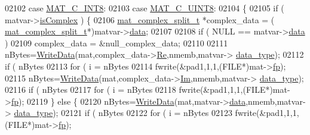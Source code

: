 \begin{DoxyCode}
{{{{{{{{{{{{{{{{02102         \textcolor{keywordflow}{case} \hyperlink{group___m_a_t_ggad4d60ae7b709fc81bfd744fb4c857c40a984ff310f9e906100fcff95f704f43c5}{MAT\_C\_INT8}:
02103         \textcolor{keywordflow}{case} \hyperlink{group___m_a_t_ggad4d60ae7b709fc81bfd744fb4c857c40a81270f8093cb4808e992c1d29d84d4e3}{MAT\_C\_UINT8}:
02104         \{
02105             \textcolor{keywordflow}{if} ( matvar->\hyperlink{group___m_a_t_aeb03b3a69f108dc05470b00443a43739}{isComplex} ) \{
02106                 \hyperlink{group___m_a_t_structmat__complex__split__t}{mat\_complex\_split\_t} *complex\_data = (
      \hyperlink{group___m_a_t_structmat__complex__split__t}{mat\_complex\_split\_t}*)matvar->\hyperlink{group___m_a_t_a5672978efa230bbdecdf38ede781f7fa}{data};
02107 
02108                 if ( NULL == matvar->\hyperlink{group___m_a_t_a5672978efa230bbdecdf38ede781f7fa}{data} )
02109                     complex\_data = &null\_complex\_data;
02110 
02111                 nBytes=\hyperlink{mat5_8c_a1bec2ccf2a3b48706edd32e63744d364}{WriteData}(mat,complex\_data->\hyperlink{group___m_a_t_a484a93607508adac2bce53a0252e0325}{Re},nmemb,matvar->
      \hyperlink{group___m_a_t_ab6aafe9bd77f0f077852593dec438144}{data\_type});
02112                 \textcolor{keywordflow}{if} ( nBytes %
02113                     \textcolor{keywordflow}{for} ( i = nBytes %
02114                         fwrite(&pad1,1,1,(FILE*)mat->\hyperlink{struct__mat__t_a85f562e407ca9ad4d2a6e14f839432b7}{fp});
02115                 nBytes=\hyperlink{mat5_8c_a1bec2ccf2a3b48706edd32e63744d364}{WriteData}(mat,complex\_data->\hyperlink{group___m_a_t_a7182d10b0d3598415887376065440946}{Im},nmemb,matvar->
      \hyperlink{group___m_a_t_ab6aafe9bd77f0f077852593dec438144}{data\_type});
02116                 \textcolor{keywordflow}{if} ( nBytes %
02117                     \textcolor{keywordflow}{for} ( i = nBytes %
02118                         fwrite(&pad1,1,1,(FILE*)mat->\hyperlink{struct__mat__t_a85f562e407ca9ad4d2a6e14f839432b7}{fp});
02119             \} \textcolor{keywordflow}{else} \{
02120                 nBytes=\hyperlink{mat5_8c_a1bec2ccf2a3b48706edd32e63744d364}{WriteData}(mat,matvar->\hyperlink{group___m_a_t_a5672978efa230bbdecdf38ede781f7fa}{data},nmemb,matvar->
      \hyperlink{group___m_a_t_ab6aafe9bd77f0f077852593dec438144}{data\_type});
02121                 \textcolor{keywordflow}{if} ( nBytes %
02122                     \textcolor{keywordflow}{for} ( i = nBytes %
02123                         fwrite(&pad1,1,1,(FILE*)mat->\hyperlink{struct__mat__t_a85f562e407ca9ad4d2a6e14f839432b7}{fp});
}}}}}}}}}}}}}}}}
\end{DoxyCode}
